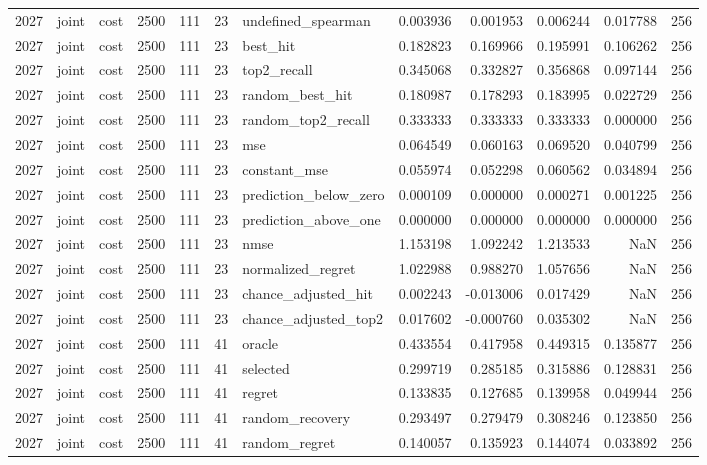 \begin{tabular}{rllrrrlrrrrr}
2027 & joint & cost & 2500 & 111 & 23 & undefined_spearman & 0.003936 & 0.001953 & 0.006244 & 0.017788 & 256 \\
2027 & joint & cost & 2500 & 111 & 23 & best_hit & 0.182823 & 0.169966 & 0.195991 & 0.106262 & 256 \\
2027 & joint & cost & 2500 & 111 & 23 & top2_recall & 0.345068 & 0.332827 & 0.356868 & 0.097144 & 256 \\
2027 & joint & cost & 2500 & 111 & 23 & random_best_hit & 0.180987 & 0.178293 & 0.183995 & 0.022729 & 256 \\
2027 & joint & cost & 2500 & 111 & 23 & random_top2_recall & 0.333333 & 0.333333 & 0.333333 & 0.000000 & 256 \\
2027 & joint & cost & 2500 & 111 & 23 & mse & 0.064549 & 0.060163 & 0.069520 & 0.040799 & 256 \\
2027 & joint & cost & 2500 & 111 & 23 & constant_mse & 0.055974 & 0.052298 & 0.060562 & 0.034894 & 256 \\
2027 & joint & cost & 2500 & 111 & 23 & prediction_below_zero & 0.000109 & 0.000000 & 0.000271 & 0.001225 & 256 \\
2027 & joint & cost & 2500 & 111 & 23 & prediction_above_one & 0.000000 & 0.000000 & 0.000000 & 0.000000 & 256 \\
2027 & joint & cost & 2500 & 111 & 23 & nmse & 1.153198 & 1.092242 & 1.213533 & NaN & 256 \\
2027 & joint & cost & 2500 & 111 & 23 & normalized_regret & 1.022988 & 0.988270 & 1.057656 & NaN & 256 \\
2027 & joint & cost & 2500 & 111 & 23 & chance_adjusted_hit & 0.002243 & -0.013006 & 0.017429 & NaN & 256 \\
2027 & joint & cost & 2500 & 111 & 23 & chance_adjusted_top2 & 0.017602 & -0.000760 & 0.035302 & NaN & 256 \\
2027 & joint & cost & 2500 & 111 & 41 & oracle & 0.433554 & 0.417958 & 0.449315 & 0.135877 & 256 \\
2027 & joint & cost & 2500 & 111 & 41 & selected & 0.299719 & 0.285185 & 0.315886 & 0.128831 & 256 \\
2027 & joint & cost & 2500 & 111 & 41 & regret & 0.133835 & 0.127685 & 0.139958 & 0.049944 & 256 \\
2027 & joint & cost & 2500 & 111 & 41 & random_recovery & 0.293497 & 0.279479 & 0.308246 & 0.123850 & 256 \\
2027 & joint & cost & 2500 & 111 & 41 & random_regret & 0.140057 & 0.135923 & 0.144074 & 0.033892 & 256 \\

\end{tabular}
